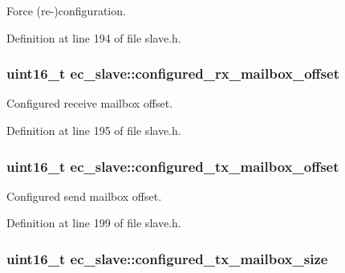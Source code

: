 \-Force (re-\/)configuration. 



\-Definition at line 194 of file slave.\-h.

\subsubsection[{configured\-\_\-rx\-\_\-mailbox\-\_\-offset}]{\setlength{\rightskip}{0pt plus 5cm}uint16\-\_\-t {\bf ec\-\_\-slave\-::configured\-\_\-rx\-\_\-mailbox\-\_\-offset}}\label{structec__slave_a885011c3377eacc3513c7806db9ea4d4}


\-Configured receive mailbox offset. 



\-Definition at line 195 of file slave.\-h.

\subsubsection[{configured\-\_\-tx\-\_\-mailbox\-\_\-offset}]{\setlength{\rightskip}{0pt plus 5cm}uint16\-\_\-t {\bf ec\-\_\-slave\-::configured\-\_\-tx\-\_\-mailbox\-\_\-offset}}\label{structec__slave_a365e2116bd54803112c56cb3a98970cb}


\-Configured send mailbox offset. 



\-Definition at line 199 of file slave.\-h.

\subsubsection[{configured\-\_\-tx\-\_\-mailbox\-\_\-size}]{\setlength{\rightskip}{0pt plus 5cm}uint16\-\_\-t {\bf ec\-\_\-slave\-::configured\-\_\-tx\-\_\-mailbox\-\_\-size}}\label{structec__slave_a79ecaa06844f2b8bf2d1b4d9bfae9207}


